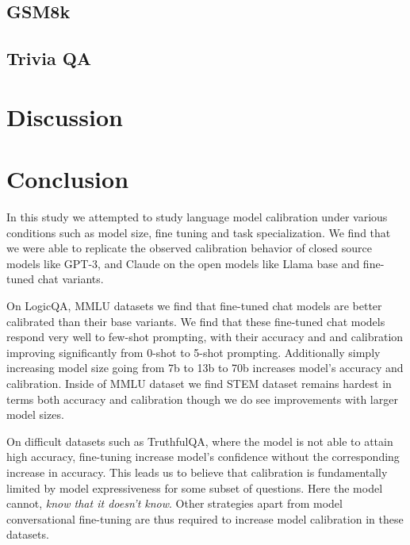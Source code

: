 \documentclass[11pt]{article}
\begin{document}
\subsection{GSM8k}

\subsection{Trivia QA}


\section{Discussion}


\section{Conclusion}

In this study we attempted to study language model calibration  under various conditions such as model size, fine tuning and task specialization. We find that we were able to replicate the observed  calibration behavior of closed source models like 
GPT-3, and  Claude on the open models like Llama base and fine-tuned chat variants. 

On LogicQA, MMLU datasets we find that fine-tuned chat models are better calibrated than their base variants.
We find that these fine-tuned chat models respond very well to few-shot prompting, with their accuracy and and calibration improving significantly from 0-shot to 5-shot prompting. Additionally simply increasing 
model size going from 7b to 13b to 70b increases model's accuracy and calibration. Inside of MMLU dataset we find  STEM dataset remains hardest in terms both accuracy and calibration though we do see improvements with larger model sizes.

On difficult datasets such as TruthfulQA, where the 
model is not able to attain high accuracy, fine-tuning 
increase model's confidence without the corresponding 
increase in accuracy. This leads us to believe that 
calibration is fundamentally limited by model 
expressiveness for some subset of questions. Here 
the model cannot, \emph{know that it doesn't know}. Other strategies apart from model conversational 
fine-tuning are thus required to increase model calibration in these datasets.
\end{document}
